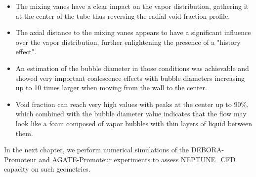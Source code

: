 \begin{itemize}
\item The mixing vanes have a clear impact on the vapor distribution, gathering it at the center of the tube thus reversing the radial void fraction profile.

\item The axial distance to the mixing vanes appears to have a significant influence over the vapor distribution, further enlightening the presence of a "history effect". 

\item An estimation of the bubble diameter in those conditions was achievable and showed very important coalescence effects with bubble diameters increasing up to 10 times larger when moving from the wall to the center.

\item Void fraction can reach very high values with peaks at the center up to $90\%$, which combined with the bubble diameter value indicates that the flow may look like a foam composed of vapor bubbles with thin layers of liquid between them.
\end{itemize}


In the next chapter, we perform numerical simulations of the DEBORA-Promoteur and AGATE-Promoteur experiments to assess NEPTUNE\_CFD capacity on such geometries.